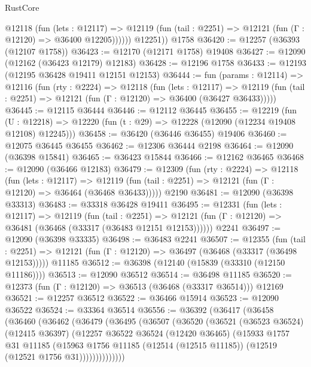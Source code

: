 \begin{lexlean}{RustCore}
\begin{coremodule}
            @12118
              (fun (lets : @12117) =>
              @12119 (fun (tail : @2251) => @12121 (fun (Γ : @12120) => @36400 @12205))))))
        @12251))
    @1758
@36420 := @12257 (@36393 (@12107 @1758))
@36423 := @12170 (@12171 @1758) @19408
@36427 := @12090 (@12162 (@36423 @12179) @12183)
@36428 := @12196 @1758
@36433 := @12193 (@12195 @36428 @19411 @12151 @12153)
@36444 := fun (params : @12114) =>
  @12116
    (fun (rty : @2224) =>
    @12118
      (fun (lets : @12117) =>
      @12119 (fun (tail : @2251) => @12121 (fun (Γ : @12120) => @36400 (@36427 @36433)))))
@36445 := @12115 @36444
@36446 := @12112 @36445
@36455 := @12219
    (fun (U : @12218) => @12220 (fun (t : @29) => @12228 (@12090 (@12234 @19408 @12108) @12245)))
@36458 := @36420 (@36446 @36455) @19406
@36460 := @12075 @36445 @36455
@36462 := @12306 @36444 @2198
@36464 := @12090 (@36398 @15841)
@36465 := @36423 @15844
@36466 := @12162 @36465
@36468 := @12090 (@36466 @12183)
@36479 := @12309
    (fun (rty : @2224) =>
    @12118
      (fun (lets : @12117) =>
      @12119 (fun (tail : @2251) => @12121 (fun (Γ : @12120) => @36464 (@36468 @36433)))))
    @2190
@36481 := @12090 (@36398 @33313)
@36483 := @33318 @36428 @19411
@36495 := @12331
    (fun (lets : @12117) =>
    @12119
      (fun (tail : @2251) =>
      @12121 (fun (Γ : @12120) => @36481 (@36468 (@33317 (@36483 @12151 @12153))))))
    @2241
@36497 := @12090 (@36398 @33335)
@36498 := @36483 @2241
@36507 := @12355
    (fun (tail : @2251) => @12121 (fun (Γ : @12120) => @36497 (@36468 (@33317 (@36498 @12153)))))
    @11185
@36512 := @36398 (@12140 (@15839 (@33310 (@12150 @11186))))
@36513 := @12090 @36512
@36514 := @36498 @11185
@36520 := @12373 (fun (Γ : @12120) => @36513 (@36468 (@33317 @36514))) @12169
@36521 := @12257 @36512
@36522 := @36466 @15914
@36523 := @12090 @36522
@36524 := @33364 @36514
@36556 := @36392
    (@36417
      (@36458
        (@36460
          (@36462
            (@36479
              (@36495
                (@36507
                  (@36520
                    (@36521
                      (@36523 @36524)
                      (@12415 @36397)
                      (@12257
                        @36522
                        @36524
                        (@12420 @36465)
                        (@15933
                          @1757
                          @31
                          @11185
                          (@15963
                            @1756
                            @11185
                            (@12514 (@12515 @11185))
                            (@12519 (@12521 @1756 @31))))))))))))))

\end{coremodule}
\end{lexlean}
